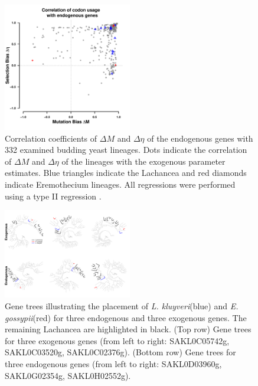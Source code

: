 \documentclass[doublespacing,linenumbers]{bmcart-modified}
\newcommand{\kluyveri}{\textit{L. kluyveri}\xspace}
\newcommand{\gossypii}{\textit{E. gossypii}\xspace}
\newcommand{\DM}{\ensuremath{{\Delta M}}\xspace}
\newcommand{\DE}{\ensuremath{{\Delta \eta}}\xspace}
\begin{document}
\begin{backmatter}
\null
\vfill
\begin{figure}
     \centering
	\includegraphics[width=0.5\textwidth]{img/figS4.pdf}%
	\caption{Correlation coefficients of \DM and \DE of the endogenous genes with 332 examined budding yeast lineages. 
	Dots indicate the correlation of \DM and \DE of the lineages with the exogenous parameter estimates.
	Blue triangles indicate the Lachancea and red diamonds indicate Eremothecium lineages.
	All regressions were performed using a type II regression \citep{SokalAndRohlf1981}.}
	\label{fig:csp_endo_comp}
\end{figure}
\null
\vfill

\null
\vfill
\begin{figure}
     \centering
	\includegraphics[width=0.5\textwidth]{img/figS5.pdf}%
	\caption{Gene trees illustrating the placement of \kluyveri (blue) and \gossypii (red) for three endogenous and three exogenous genes. 
	The remaining Lachancea are highlighted in black. 
	(Top row)  Gene trees for three exogenous genes (from left to right: SAKL0C05742g, SAKL0C03520g, SAKL0C02376g).
	(Bottom row) Gene trees for three endogenous genes (from left to right: SAKL0D03960g, SAKL0G02354g, SAKL0H02552g).}
	\label{fig:phylo_relation}
\end{figure}
\null
\vfill


\end{backmatter}
\end{document}
